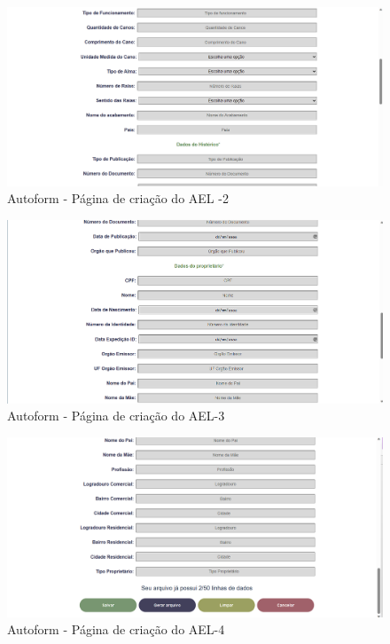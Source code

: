 \begin{figure}[H]
    \caption{\label{fig:tela-ael2}Autoform - Página de criação do AEL -2}
    \begin{center}
        \includegraphics[scale=0.45]{imagens/autoform-ael-gerar2.png}
    \end{center}
\end{figure}
\begin{figure}[H]
    \caption{\label{fig:tela-ael3}Autoform - Página de criação do AEL-3}
    \begin{center}
        \includegraphics[scale=0.45]{imagens/autoform-ael-gerar3.png}
    \end{center}
\end{figure}

\begin{figure}[H]
    \caption{\label{fig:tela-ael4}Autoform - Página de criação do AEL-4}
    \begin{center}
        \includegraphics[scale=0.45]{imagens/autoform-ael-gerar4.png}
    \end{center}
\end{figure}


